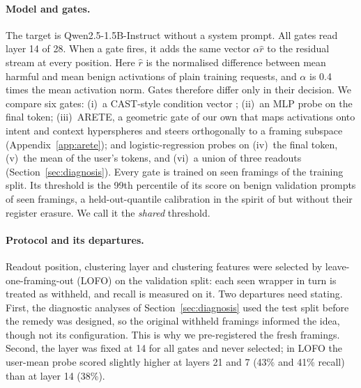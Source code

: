 \documentclass[11pt]{article}
\begin{document}
\paragraph{Model and gates.}
The target is Qwen2.5-1.5B-Instruct \citep{qwen2024qwen25} without a system prompt. All gates read layer 14 of 28. When a gate fires, it adds the same vector $\alpha\hat r$ to the residual stream at every position. Here $\hat r$ is the normalised difference between mean harmful and mean benign activations of plain training requests, and $\alpha$ is 0.4 times the mean activation norm. Gates therefore differ only in their decision. We compare six gates: (i)~a CAST-style condition vector \citep{lee2025cast}; (ii)~an MLP probe on the final token; (iii)~ARETE, a geometric gate of our own that maps activations onto intent and context hyperspheres and steers orthogonally to a framing subspace (Appendix~\ref{app:arete}); and logistic-regression probes on (iv)~the final token, (v)~the mean of the user's tokens, and (vi)~a union of three readouts (Section~\ref{sec:diagnosis}). Every gate is trained on seen framings of the training split. Its threshold is the 99th percentile of its score on benign validation prompts of seen framings, a held-out-quantile calibration in the spirit of \citet{kim2026linearly} but without their register erasure. We call it the \emph{shared} threshold.

\paragraph{Protocol and its departures.}
Readout position, clustering layer and clustering features were selected by leave-one-framing-out (LOFO) on the validation split: each seen wrapper in turn is treated as withheld, and recall is measured on it. Two departures need stating. First, the diagnostic analyses of Section~\ref{sec:diagnosis} used the test split before the remedy was designed, so the original withheld framings informed the idea, though not its configuration. This is why we pre-registered the fresh framings. Second, the layer was fixed at 14 for all gates and never selected; in LOFO the user-mean probe scored slightly higher at layers 21 and 7 (43\% and 41\% recall) than at layer 14 (38\%).
\end{document}
